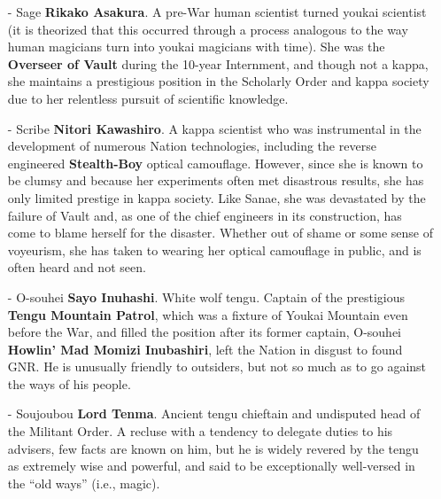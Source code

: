 \documentclass[a4paper,12pt]{book}
\newcommand{\maru}[1]{\raisebox{.5pt}{\textcircled{\raisebox{-.9pt} {#1}}}}
\begin{document}
\begin{itemize}
\item[-] Sage \textbf{Rikako Asakura}. A pre-War human scientist turned youkai scientist (it is theorized that this occurred through a process analogous to the way human magicians turn into youkai magicians with time). She was the \textbf{Overseer of Vault \maru{11}} during the 10-year Internment, and though not a kappa, she maintains a prestigious position in the Scholarly Order and kappa society due to her relentless pursuit of scientific knowledge.
\item[-] Scribe \textbf{Nitori Kawashiro}. A kappa scientist who was instrumental in the development of numerous Nation technologies, including the reverse engineered \textbf{Stealth-Boy} optical camouflage. However, since she is known to be clumsy and because her experiments often met disastrous results, she has only limited prestige in kappa society. Like Sanae, she was devastated by the failure of Vault \maru{13} and, as one of the chief engineers in its construction, has come to blame herself for the disaster. Whether out of shame or some sense of voyeurism, she has taken to wearing her optical camouflage in public, and is often heard and not seen.
\item[-] O-souhei \textbf{Sayo Inuhashi}. White wolf tengu. Captain of the prestigious \textbf{Tengu Mountain Patrol}, which was a fixture of Youkai Mountain even before the War, and filled the position after its former captain, O-souhei \textbf{Howlin' Mad Momizi Inubashiri}, left the Nation in disgust to found GNR. He is unusually friendly to outsiders, but not so much as to go against the ways of his people.
\item[-] Soujoubou \textbf{Lord Tenma}. Ancient tengu chieftain and undisputed head of the Militant Order. A recluse with a tendency to delegate duties to his advisers, few facts are known on him, but he is widely revered by the tengu as extremely wise and powerful, and said to be exceptionally well-versed in the “old ways” (i.e., magic).
\end{itemize}
\end{document}
